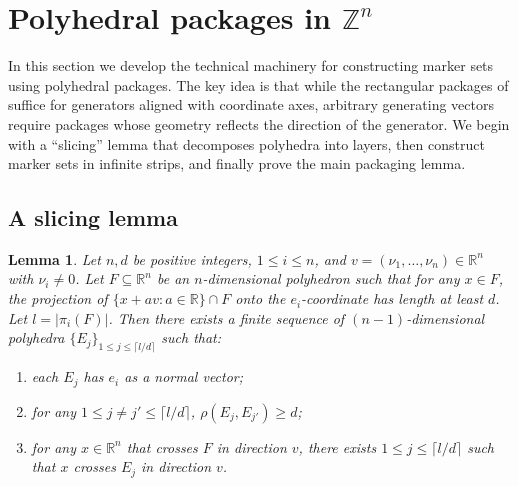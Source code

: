 \documentclass[10pt,a4paper]{amsart}
\newtheorem{lemma}[theorem]{Lemma}
\begin{document}
\section{Polyhedral packages in $\mathbb{Z}^n$}\label{sec:packages}

In this section we develop the technical machinery for constructing
marker sets using polyhedral packages. The key idea is that while the
rectangular packages of \cite{GW25} suffice for generators aligned with
coordinate axes, arbitrary generating vectors require packages whose
geometry reflects the direction of the generator. We begin with a
``slicing'' lemma that decomposes polyhedra into layers, then construct
marker sets in infinite strips, and finally prove the main packaging lemma.

\subsection{A slicing lemma}

\begin{lemma}\label{lem:layer}
Let $n, d$ be positive integers, $1\leq i\leq n$, and
$v=(\nu_1,\dots,\nu_n)\in\mathbb{R}^n$ with $\nu_i\neq 0$.
Let $F\subseteq\mathbb{R}^n$ be an $n$-dimensional polyhedron such that for
any $x\in F$, the projection of $\{x+av\colon a\in\mathbb{R}\}\cap F$
onto the $e_i$-coordinate has length at least $d$. Let $l=|\pi_i(F)|$.
Then there exists a finite sequence of $(n-1)$-dimensional polyhedra
$\{E_j\}_{1\leq j\leq \lceil l/d\rceil}$ such that:
\begin{enumerate}
\item[(1)] each $E_j$ has $e_i$ as a normal vector;
\item[(2)] for any $1\leq j\neq j'\leq \lceil l/d\rceil$,
$\rho(E_j, E_{j'})\geq d$;
\item[(3)] for any $x\in\mathbb{R}^n$ that crosses $F$ in direction $v$,
there exists $1\leq j\leq \lceil l/d\rceil$ such that $x$ crosses $E_j$
in direction $v$.
\end{enumerate}
\end{lemma}
\end{document}
